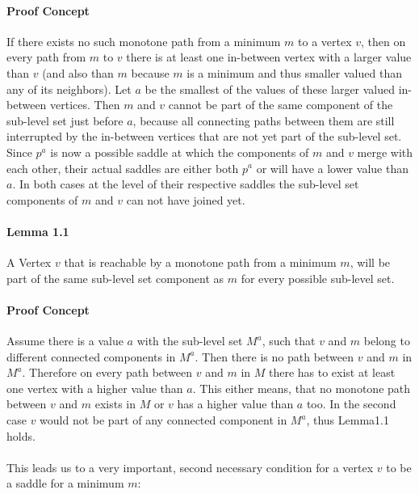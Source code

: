 \documentclass{scrartcl}
\begin{document}
\paragraph{Proof Concept} 
If there exists no such monotone path from a minimum \(m\) to a vertex \(v\), then on every path from \(m\) to \(v\) there is at least one in-between vertex with a larger value than \(v\) (and also than \(m\) because \(m\) is a minimum and thus smaller valued than any of its neighbors). Let \(a\) be the smallest of the values of these larger valued in-between vertices. Then \(m\) and \(v\) cannot be part of the same component of the sub-level set just before \(a\), because all connecting paths between them are still interrupted by the in-between vertices that are not yet part of the sub-level set. Since \(p^{a}\) is now a possible saddle at which the components of \(m\) and \(v\) merge with each other, their actual saddles are either both \(p^a\) or will have a lower value than \(a\). In both cases at the level of their respective saddles the sub-level set components of \(m\) and \(v\) can not have joined yet.

\paragraph{Lemma 1.1} A Vertex \(v\) that is reachable by a monotone path from a minimum \(m\), will be part of the same sub-level set component as \(m\) for every possible sub-level set.

\paragraph{Proof Concept}
Assume there is a value \(a\) with the sub-level set \(M^a\), such that \(v\) and \(m\) belong to different connected components in \(M^a\). Then there is no path between \(v\) and \(m\) in \(M^a\). Therefore on every path between \(v\) and \(m\) in \(M\) there has to exist at least one vertex with a higher value than \(a\). This either means, that no monotone path between \(v\) and \(m\) exists in \(M\) or \(v\) has a higher value than \(a\) too. In the second case \(v\) would not be part of any connected component in \(M^a\), thus Lemma1.1 holds.

\paragraph{}
This leads us to a very important, second necessary condition for a vertex \(v\) to be a saddle for a minimum \(m\):
\end{document}
